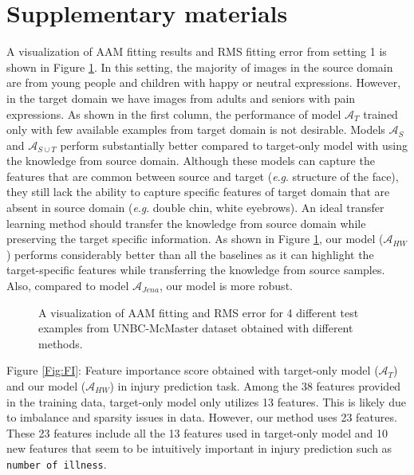 \documentclass{article}
\newcommand{\eg}{\textit{e}.\textit{g}. }
\begin{document}



\newpage
\section{Supplementary materials}
\label{sec:supp}
A visualization of AAM fitting results and RMS fitting error from setting 1 is shown in Figure \ref{fig:aam}. In this setting, the majority of images in the source domain are from young people
and children with happy or neutral expressions. However, in the target domain we have images from adults and seniors with pain expressions. As shown in the first column, the performance of model $\mathcal{A}_T$ trained only with few available examples from target domain is not desirable. Models $\mathcal{A}_S$ and $\mathcal{A}_{S\cup T}$ perform substantially better compared to target-only model with using the knowledge from source domain. Although these models can capture the features that are common between source and target (\eg structure of the face), they still lack the ability to capture specific features of target domain that are absent in source domain (\eg double chin, white eyebrows). An ideal transfer learning method should transfer the knowledge from source domain while preserving the target specific information. As shown in Figure \ref{fig:aam}, our model ($\mathcal{A}_{HW}$) performs considerably better than all the baselines as it can highlight the target-specific features while transferring the knowledge from source samples. Also, compared to model $\mathcal{A}_{Jena}$, our model is more robust. 
\begin{figure}[htbp]
\fboxsep=0mm
\fboxrule=2pt
\centering
{}
\caption{A visualization of AAM fitting and RMS error for 4 different test examples from UNBC-McMaster dataset obtained with different methods.}
\label{fig:aam}
\end{figure}

\newpage
Figure \ref{Fig:FI}: Feature importance score obtained with target-only model ($\mathcal{A}_T$) and our model ($\mathcal{A}_{HW}$) in injury prediction task. Among the 38 features provided in the training data, target-only model only utilizes 13 features. This is likely due to imbalance  and sparsity issues in data. However, our method uses 23 features. These 23 features include all the 13 features used in target-only model and 10 new features that seem to be intuitively important in injury prediction such as \texttt{number of illness}. 
\begin{figure*}[htbp]
\centering
{}
\hspace{.2cm}
\caption{Illustration of feature importance scores obtained with target-only model ($\mathcal{A}_T$) and our hybrid model ($\mathcal{A}_{HW}$). Feature names are masked for confidentiality reasons.}
\label{Fig:FI}
\end{figure*}
\end{document}
